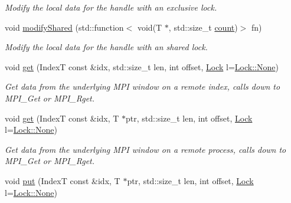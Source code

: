 \begin{DoxyCompactItemize}
\begin{DoxyCompactList}\small\item\em Modify the local data for the handle with an exclusive lock. \end{DoxyCompactList}\item 
void \hyperlink{structvt_1_1rdma_1_1_handle_3_01_t_00_01_e_00_01_index_t_00_01typename_01std_1_1enable__if__t_3_f66c3940d9f3649c3a5c3e77d63c658a_a1e54b62400f4e12e2e7e4862851352c9}{modify\+Shared} (std\+::function$<$ void(T $\ast$, std\+::size\+\_\+t \hyperlink{structvt_1_1rdma_1_1_base_typed_handle_a1e7937b5cf4b641a783c37675ae2cc35}{count})$>$ fn)
\begin{DoxyCompactList}\small\item\em Modify the local data for the handle with an shared lock. \end{DoxyCompactList}\item 
void \hyperlink{structvt_1_1rdma_1_1_handle_3_01_t_00_01_e_00_01_index_t_00_01typename_01std_1_1enable__if__t_3_f66c3940d9f3649c3a5c3e77d63c658a_a700818b012865e7c8523abe143dc37e5}{get} (IndexT const \&idx, std\+::size\+\_\+t len, int offset, \hyperlink{namespacevt_1_1rdma_ac5c20b41a653e520b6305d4d454ecb70}{Lock} l=\hyperlink{namespacevt_1_1rdma_ac5c20b41a653e520b6305d4d454ecb70a6adf97f83acf6453d4a6a4b1070f3754}{Lock\+::\+None})
\begin{DoxyCompactList}\small\item\em Get data from the underlying M\+PI window on a remote index, calls down to {\ttfamily M\+P\+I\+\_\+\+Get} or {\ttfamily M\+P\+I\+\_\+\+Rget}. \end{DoxyCompactList}\item 
void \hyperlink{structvt_1_1rdma_1_1_handle_3_01_t_00_01_e_00_01_index_t_00_01typename_01std_1_1enable__if__t_3_f66c3940d9f3649c3a5c3e77d63c658a_ac1f836e8530774b590430504e747c901}{get} (IndexT const \&idx, T $\ast$ptr, std\+::size\+\_\+t len, int offset, \hyperlink{namespacevt_1_1rdma_ac5c20b41a653e520b6305d4d454ecb70}{Lock} l=\hyperlink{namespacevt_1_1rdma_ac5c20b41a653e520b6305d4d454ecb70a6adf97f83acf6453d4a6a4b1070f3754}{Lock\+::\+None})
\begin{DoxyCompactList}\small\item\em Get data from the underlying M\+PI window on a remote process, calls down to {\ttfamily M\+P\+I\+\_\+\+Get} or {\ttfamily M\+P\+I\+\_\+\+Rget}. \end{DoxyCompactList}\item 
void \hyperlink{structvt_1_1rdma_1_1_handle_3_01_t_00_01_e_00_01_index_t_00_01typename_01std_1_1enable__if__t_3_f66c3940d9f3649c3a5c3e77d63c658a_a7b6743e3f3bace08a1c6fce3b19f27c6}{put} (IndexT const \&idx, T $\ast$ptr, std\+::size\+\_\+t len, int offset, \hyperlink{namespacevt_1_1rdma_ac5c20b41a653e520b6305d4d454ecb70}{Lock} l=\hyperlink{namespacevt_1_1rdma_ac5c20b41a653e520b6305d4d454ecb70a6adf97f83acf6453d4a6a4b1070f3754}{Lock\+::\+None})

\end{DoxyCompactItemize}
